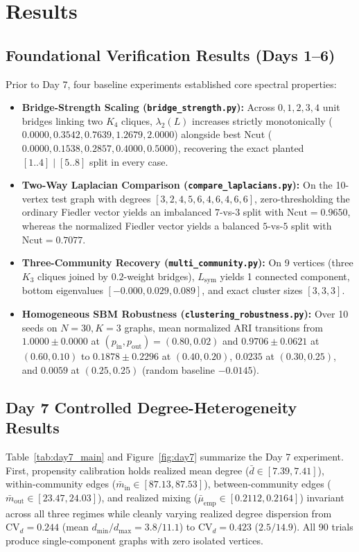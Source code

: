 \documentclass[10pt,twocolumn,a4paper]{article}
\begin{document}
\section{Results}
\subsection{Foundational Verification Results (Days 1--6)}
Prior to Day 7, four baseline experiments established core spectral properties:
\begin{itemize}\setlength{\itemsep}{1pt}\setlength{\parskip}{0pt}
    \item \textbf{Bridge-Strength Scaling (\texttt{bridge\_strength.py}):} Across $0, 1, 2, 3, 4$ unit bridges linking two $K_4$ cliques, $\lambda_2(L)$ increases strictly monotonically ($0.0000, 0.3542, 0.7639, 1.2679, 2.0000$) alongside best Ncut ($0.0000, 0.1538, 0.2857, 0.4000, 0.5000$), recovering the exact planted $[1..4]\mid[5..8]$ split in every case.
    \item \textbf{Two-Way Laplacian Comparison (\texttt{compare\_laplacians.py}):} On the 10-vertex test graph with degrees $[3, 2, 4, 5, 6, 4, 6, 4, 6, 6]$, zero-thresholding the ordinary Fiedler vector yields an imbalanced $7$-vs-$3$ split with $\mathrm{Ncut} = 0.9650$, whereas the normalized Fiedler vector yields a balanced $5$-vs-$5$ split with $\mathrm{Ncut} = 0.7077$.
    \item \textbf{Three-Community Recovery (\texttt{multi\_community.py}):} On 9 vertices (three $K_3$ cliques joined by $0.2$-weight bridges), $L_{\mathrm{sym}}$ yields 1 connected component, bottom eigenvalues $[-0.000, 0.029, 0.089]$, and exact cluster sizes $[3, 3, 3]$.
    \item \textbf{Homogeneous SBM Robustness (\texttt{clustering\_robustness.py}):} Over 10 seeds on $N=30, K=3$ graphs, mean normalized ARI transitions from $1.0000 \pm 0.0000$ at $(p_{\mathrm{in}}, p_{\mathrm{out}})=(0.80, 0.02)$ and $0.9706 \pm 0.0621$ at $(0.60, 0.10)$ to $0.1878 \pm 0.2296$ at $(0.40, 0.20)$, $0.0235$ at $(0.30, 0.25)$, and $0.0059$ at $(0.25, 0.25)$ (random baseline $-0.0145$).
\end{itemize}

\subsection{Day 7 Controlled Degree-Heterogeneity Results}
Table~\ref{tab:day7_main} and Figure~\ref{fig:day7} summarize the Day 7 experiment. First, propensity calibration holds realized mean degree ($\bar{d} \in [7.39, 7.41]$), within-community edges ($\bar{m}_{\mathrm{in}} \in [87.13, 87.53]$), between-community edges ($\bar{m}_{\mathrm{out}} \in [23.47, 24.03]$), and realized mixing ($\bar{\mu}_{\mathrm{emp}} \in [0.2112, 0.2164]$) invariant across all three regimes while cleanly varying realized degree dispersion from $\mathrm{CV}_d = 0.244$ (mean $d_{\min}/d_{\max} = 3.8/11.1$) to $\mathrm{CV}_d = 0.423$ ($2.5/14.9$). All 90 trials produce single-component graphs with zero isolated vertices.
\end{document}
